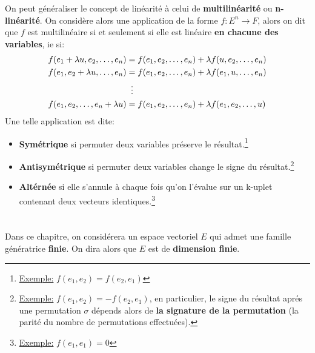 \subsection*{}

On peut généraliser le concept de linéarité à celui de \textbf{multilinéarité} ou \textbf{n-linéarité}. On considère alors une application de la forme \(f : E^n \longrightarrow F\), alors on dit que \(f\) est multilinéaire si et seulement si elle est linéaire \textbf{en chacune des variables}, ie si:
\begin{align*}
   f(e_1 + \lambda u, e_2, \ldots, e_n) &= f(e_1, e_2, \ldots, e_n) + \lambda f(u, e_2, \ldots, e_n)  \\
   f(e_1, e_2  + \lambda u, \ldots, e_n) &= f(e_1, e_2, \ldots, e_n) + \lambda f(e_1, u, \ldots, e_n) \\
   & \vdotswithin{=} \\   
   f(e_1, e_2 , \ldots, e_n + \lambda u) &= f(e_1, e_2, \ldots, e_n) + \lambda f(e_1, e_2, \ldots, u)
\end{align*}
Une telle application est dite:
\begin{itemize}
   \item \textbf{Symétrique} si permuter deux variables préserve le résultat.\footnote[1]{\underline{Exemple:} \(f(e_1, e_2) = f(e_2, e_1)\)}
   \item \textbf{Antisymétrique} si permuter deux variables change le signe du résultat.\footnote[2]{\underline{Exemple:} \(f(e_1, e_2) = -f(e_2, e_1)\), en particulier, le signe du résultat aprés une permutation \(\sigma\) dépends alors de \textbf{la signature de la permutation} (la parité du nombre de permutations effectuées).}
   \item  \textbf{Altérnée} si elle s'annule à chaque fois qu'on l'évalue sur un k-uplet contenant deux vecteurs identiques.\footnote[3]{\underline{Exemple:} \(f(e_1, e_1) = 0\)}
\end{itemize}

\chapter*{} %

Dans ce chapitre, on considérera un espace vectoriel \(E\) qui admet une famille génératrice \textbf{finie}. On dira alors que \(E\) est de \textbf{dimension finie}.

